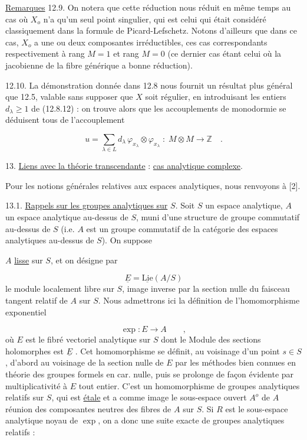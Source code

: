 \underline{Remarques} 12.9. On notera que cette réduction nous réduit en même temps au cas où $X_{o}$ n'a qu'un seul point singulier, qui est celui qui était considéré classiquement dans la formule de Picard-Lefschetz. Notons d'ailleurs que dans ce cas, $X_{o}$ a une ou deux composantes irréductibles, ces cas correspondants respectivement à rang $M = 1$ et rang $M = 0$ (ce dernier cas étant celui où la jacobienne de la fibre générique a bonne réduction).

12.10.  La démonstration donnée dans 12.8 nous fournit un résultat plus général que 12.5, valable sans supposer que $X$ soit régulier, en introduisant les entiers $d_{\lambda} \geqslant 1$ de (12.8.12) : on trouve alors que les accouplements de monodormie se déduisent tous de l'accouplement

\begin{equation}\tag{12.10.1}
u = \sum_{\lambda \in L} d_{\lambda} \, \varphi_{x_{\lambda}} \otimes \varphi_{x_{\lambda}} \; : \; M \otimes M \longrightarrow \mathbb{Z} \quad .
\end{equation}

13.  \underline{Liens avec la théorie transcendante} : \underline{cas analytique complexe}.

Pour les notions générales relatives aux espaces analytiques, nous renvoyons à [2].

13.1.  \underline{Rappels sur les groupes analytiques sur} $S$.  Soit $S$ un espace analytique, $A$ un espace analytique au-dessus de $S$, muni d'une structure de groupe commutatif au-dessus de $S$ (i.e. $A$ est un groupe commutatif de la catégorie des espaces analytiques au-dessus de $S$). On suppose



$A$ \underline{lisse} sur $S$, et on désigne par

\begin{equation}\tag{13.1.1}
\underline{E} = \underline{\mathrm{Lie}}(A/S)
\end{equation}
le module localement libre sur $S$, image inverse par la section nulle du faisceau tangent relatif de $A$ sur $S$. Nous admettrons ici la définition de l'homomorphisme exponentiel

\begin{equation}\tag{13.1.2}
\exp: E \longrightarrow A \qquad ,
\end{equation}
où $E$ est le fibré vectoriel analytique sur $S$ dont le Module des sections holomorphes est $\underline{E}$ . Cet homomorphisme se définit, au voisinage d'un point $s \in S$, d'abord au voisinage de la section nulle de $E$ par les méthodes bien connues en théorie des groupes formels en car. nulle, puis se prolonge de façon évidente par multiplicativité à $E$ tout entier. C'est un homomorphisme de groupes analytiques relatifs sur $S$, qui est \underline{étale} et a comme image le sous-espace ouvert $A^{o}$ de $A$ réunion des composantes neutres des fibres de $A$ sur $S$. Si $R$ est le sous-espace analytique noyau de $\exp$, on a donc une suite exacte de groupes analytiques relatifs :

